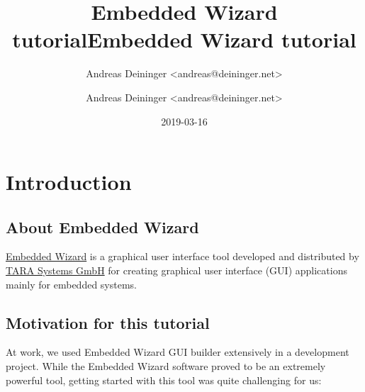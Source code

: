 \documentclass[
  a4paper,
,tablecaptionabove
]{scrbook}
\title{Embedded Wizard tutorial}
\author{Andreas Deininger <andreas@deininger.net>}
\date{2019-03-16}
\title{Embedded Wizard tutorial}
\author{Andreas Deininger <andreas@deininger.net>}
\begin{document}

\begin{titlepage}
\newcommand{\colorRule}[3][black]{\textcolor[HTML]{#1}{\rule{#2}{#3}}}
\end{titlepage}
\restoregeometry


{
\setcounter{tocdepth}{3}
\tableofcontents
}

\chapter{Introduction}


\hypertarget{_about_embedded_wizard}{%
\section{About Embedded Wizard}
\label{_about_embedded_wizard}}

\href{https://www.embedded-wizard.de/}{Embedded Wizard} is a graphical
user interface tool developed and distributed by
\href{https://www.tara-systems.de/}{TARA Systems GmbH} for creating
graphical user interface (GUI) applications mainly for embedded systems.

\hypertarget{_motivation_for_this_tutorial}{%
\section{Motivation for this
tutorial}\label{_motivation_for_this_tutorial}}

At work, we used Embedded Wizard GUI builder extensively in a
development project. While the Embedded Wizard software proved to be an
extremely powerful tool, getting started with this tool was quite
challenging for us:
\end{document}

